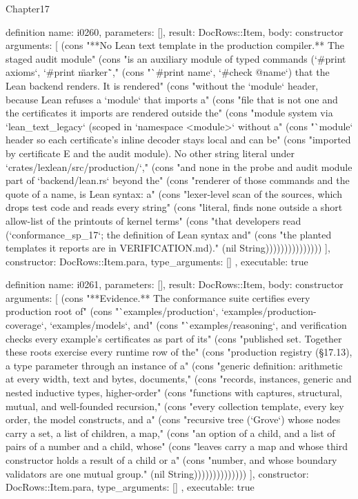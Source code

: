 \begin{lexlean}{Chapter17}
\begin{semanticmodule}
definition{
  name: i0260,
  parameters: [],
  result: DocRows::Item,
  body: constructor{
    arguments: [
      (cons "**No Lean text template in the production compiler.** The staged audit module" (cons "is an auxiliary module of typed commands (`#print axioms`, `#print \"marker\"`," (cons "`#print name`, `#check @name`) that the Lean backend renders. It is rendered" (cons "without the `module` header, because Lean refuses a `module` that imports a" (cons "file that is not one and the certificates it imports are rendered outside the" (cons "module system via `lean_text_legacy` (scoped in `namespace <module>` without a" (cons "`module` header so each certificate's inline decoder stays local and can be" (cons "imported by certificate E and the audit module). No other string literal under `crates/lexlean/src/production/`," (cons "and none in the probe and audit module part of `backend/lean.rs` beyond the" (cons "renderer of those commands and the quote of a name, is Lean syntax: a" (cons "lexer-level scan of the sources, which drops test code and reads every string" (cons "literal, finds none outside a short allow-list of the printouts of kernel terms" (cons "that developers read (`conformance_sp_17`; the definition of Lean syntax and" (cons "the planted templates it reports are in VERIFICATION.md)." (nil String)))))))))))))))
    ],
    constructor: DocRows::Item.para,
    type_arguments: []
  },
  executable: true
}

definition{
  name: i0261,
  parameters: [],
  result: DocRows::Item,
  body: constructor{
    arguments: [
      (cons "**Evidence.** The conformance suite certifies every production root of" (cons "`examples/production`, `examples/production-coverage`, `examples/models`, and" (cons "`examples/reasoning`, and verification checks every example's certificates as part of its" (cons "published set. Together these roots exercise every runtime row of the" (cons "production registry (§17.13), a type parameter through an instance of a" (cons "generic definition: arithmetic at every width, text and bytes, documents," (cons "records, instances, generic and nested inductive types, higher-order" (cons "functions with captures, structural, mutual, and well-founded recursion," (cons "every collection template, every key order, the model constructs, and a" (cons "recursive tree (`Grove`) whose nodes carry a set, a list of children, a map," (cons "an option of a child, and a list of pairs of a number and a child, whose" (cons "leaves carry a map and whose third constructor holds a result of a child or a" (cons "number, and whose boundary validators are one mutual group." (nil String))))))))))))))
    ],
    constructor: DocRows::Item.para,
    type_arguments: []
  },
  executable: true
}


\end{semanticmodule}
\end{lexlean}
